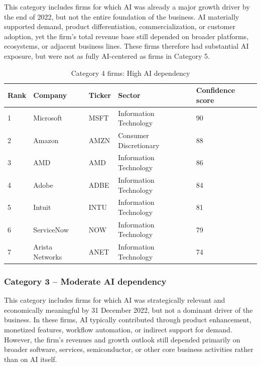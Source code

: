 \documentclass{article}
\begin{document}
This category includes firms for which AI was already a major growth driver by the end of 2022, but not the entire foundation of the business. AI materially supported demand, product differentiation, commercialization, or customer adoption, yet the firm’s total revenue base still depended on broader platforms, ecosystems, or adjacent business lines. These firms therefore had substantial AI exposure, but were not as fully AI-centered as firms in Category 5.

\begin{table}[H]
\centering
\caption{Category 4 firms: High AI dependency}
\small
\renewcommand{\arraystretch}{1.15}
\begin{tabularx}{\textwidth}{@{} C{1.1cm} L{4.2cm} C{1.6cm} L{4.3cm} C{2.3cm} @{}}
\toprule
\textbf{Rank} & \textbf{Company} & \textbf{Ticker} & \textbf{Sector} & \textbf{Confidence score} \\
 & Microsoft & MSFT & Information Technology & 90 \\
2 & Amazon & AMZN & Consumer Discretionary & 88 \\
3 & AMD & AMD & Information Technology & 86 \\
4 & Adobe & ADBE & Information Technology & 84 \\
5 & Intuit & INTU & Information Technology & 81 \\
6 & ServiceNow & NOW & Information Technology & 79 \\
7 & Arista Networks & ANET & Information Technology & 74 \\
\bottomrule
\end{tabularx}
\label{tab:category4}
\end{table}

\subsubsection*{Category 3 -- Moderate AI dependency}

This category includes firms for which AI was strategically relevant and economically meaningful by 31 December 2022, but not a dominant driver of the business. In these firms, AI typically contributed through product enhancement, monetized features, workflow automation, or indirect support for demand. However, the firm’s revenues and growth outlook still depended primarily on broader software, services, semiconductor, or other core business activities rather than on AI itself.
\end{document}
